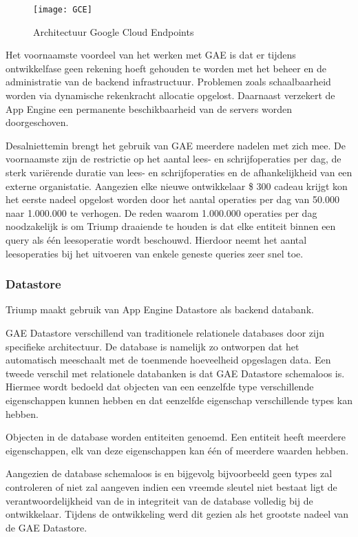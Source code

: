 \begin{figure}[H]
	\centering
	\texttt{[image: GCE]}
	\caption{Architectuur Google Cloud Endpoints}
	\label{fig:Architectuur Google Cloud Endpoints}
\end{figure}

Het voornaamste voordeel van het werken met GAE is dat er tijdens ontwikkelfase geen rekening hoeft gehouden te worden met het  beheer en de administratie van de backend infrastructuur. Problemen zoals schaalbaarheid worden via dynamische rekenkracht allocatie opgelost. Daarnaast verzekert de App Engine een permanente beschikbaarheid van de servers worden doorgeschoven.

Desalniettemin brengt het gebruik van GAE meerdere nadelen met zich mee. De voornaamste zijn de restrictie op het aantal lees- en schrijfoperaties per dag, de sterk variërende duratie van lees- en schrijfoperaties en de afhankelijkheid van een externe organistatie. Aangezien elke nieuwe ontwikkelaar \$ 300 cadeau krijgt kon het eerste nadeel opgelost worden door het aantal operaties per dag van 50.000 naar 1.000.000 te verhogen. De reden waarom 1.000.000 operaties per dag noodzakelijk is om Triump draaiende te houden is dat elke entiteit binnen een query als één leesoperatie wordt beschouwd. Hierdoor neemt het aantal leesoperaties bij het uitvoeren van enkele geneste queries zeer snel toe.

\subsubsection{Datastore}

Triump maakt gebruik van App Engine Datastore als backend databank.

GAE Datastore verschillend van traditionele relationele databases door zijn specifieke architectuur. De database is namelijk zo ontworpen dat het automatisch meeschaalt met de toenmende hoeveelheid opgeslagen data. Een tweede verschil met relationele databanken is dat GAE Datastore schemaloos is. Hiermee wordt bedoeld dat objecten van een eenzelfde type verschillende eigenschappen kunnen hebben en dat eenzelfde eigenschap verschillende types kan hebben. 

Objecten in de database worden entiteiten genoemd. Een entiteit heeft meerdere eigenschappen, elk van deze eigenschappen kan één of meerdere waarden hebben. 

Aangezien de database schemaloos is en bijgevolg bijvoorbeeld geen types zal controleren of niet zal aangeven indien een vreemde sleutel niet bestaat ligt de verantwoordelijkheid van de in integriteit van de database volledig bij de ontwikkelaar. Tijdens de ontwikkeling werd dit gezien als het grootste nadeel van de GAE Datastore.

